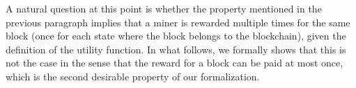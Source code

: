 A natural question at this point is whether the property mentioned in the previous paragraph implies that a miner is rewarded  multiple times for the same block (once for each state where the block belongs to the blockchain), given the definition of the utility function. In what follows, we formally shows that this is not the case in the sense that the reward for a block can be paid at most once, which is the second desirable property of our formalization.


